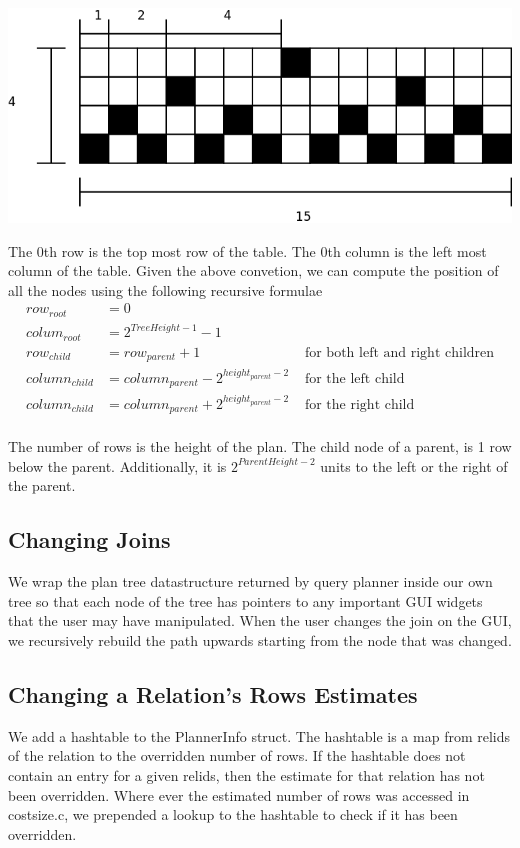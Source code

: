 \documentclass[letterpaper,10pt]{article}
\begin{document}
\includegraphics[scale=0.5]{table-derivation.png}

The 0th row is the top most row of the table. The 0th column is the left most
column of the table. Given the above convetion, we can compute the position of
all the nodes using the following recursive formulae \\
\begin{align*}
	row_{root} & = 0 \\
	colum_{root} & = 2^{TreeHeight-1}-1 \\
	row_{child} & = row_{parent} + 1 & \mbox { for both left and right children}\\
	column_{child} & = column_{parent} - 2^{height_{parent}-2} & \mbox { for the left child} \\
	column_{child} & = column_{parent} + 2^{height_{parent}-2} & \mbox { for the right child} \\
\end{align*}

The number of rows is the height of the plan. The child node of a parent, is 1
row below the parent. Additionally, it is $2^{ParentHeight-2}$ units to the left
or the right of the parent.

\subsection{Changing Joins}
We wrap the plan tree datastructure returned by query planner inside our own
tree so that each node of the tree has pointers to any important GUI widgets
that the user may have manipulated. When the user changes the join on the GUI,
we recursively rebuild the path upwards starting from the node that was changed.

\subsection{Changing a Relation's Rows Estimates}
We add a hashtable to the PlannerInfo struct. The hashtable is a map from relids
of the relation to the overridden number of rows. If the hashtable does not
contain an entry for a given relids, then the estimate for that relation has not
been overridden. Where ever the estimated number of rows was accessed in costsize.c, we
prepended a lookup to the hashtable to check if it has been overridden.
\end{document}
